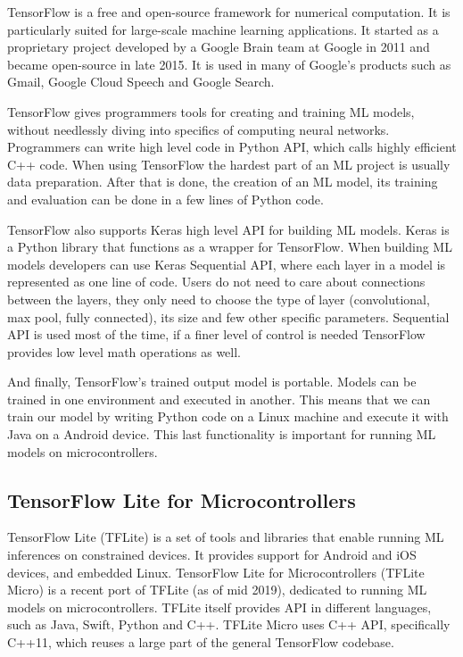 TensorFlow is a free and open-source framework for numerical computation.
It is particularly suited for large-scale machine learning applications\cite{geron}.
It started as a proprietary project developed by a Google Brain team at Google in 2011 and became open-source in late 2015.
It is used in many of Google's products such as Gmail, Google Cloud Speech and Google Search.

TensorFlow gives programmers tools for creating and training ML models, without needlessly diving into specifics of computing neural networks.
Programmers can write high level code in Python API, which calls highly efficient C++ code.
When using TensorFlow the hardest part of an ML project is usually data preparation.
After that is done, the creation of an ML model, its training and evaluation can be done in a few lines of Python code.

TensorFlow also supports Keras high level API for building ML models. 
Keras is a Python library that functions as a wrapper for TensorFlow.
When building ML models developers can use Keras Sequential API, where each layer in a model is represented as one line of code.
Users do not need to care about connections between the layers, they only need to choose the type of layer (convolutional, max pool, fully connected), its size and few other specific parameters.
Sequential API is used most of the time, if a finer level of control is needed TensorFlow provides low level math operations as well.

And finally, TensorFlow's trained output model is portable\cite{geron}.
Models can be trained in one environment and executed in another.
This means that we can train our model by writing Python code on a Linux machine and execute it with Java on a Android device.
This last functionality is important for running ML models on microcontrollers.

\subsection{ TensorFlow Lite for Microcontrollers} \label{tflite_quant}

TensorFlow Lite (TFLite) is a set of tools and libraries that enable running ML inferences on constrained devices\cite{tensorflow_github}.
It provides support for Android and iOS devices, and embedded Linux.
TensorFlow Lite for Microcontrollers (TFLite Micro) is a recent port of TFLite (as of mid 2019), dedicated to running ML models on microcontrollers.
TFLite itself provides API in different languages, such as Java, Swift, Python and C++.
TFLite Micro uses C++ API, specifically C++11, which reuses a large part of the general TensorFlow codebase.

